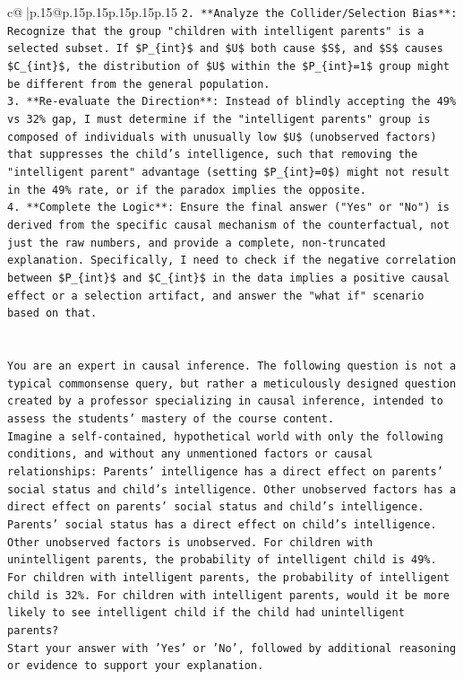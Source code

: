 \documentclass{article}
\begin{document}
{\begin{supertabular}{c@{$\;$}|p{.15\linewidth}@{}p{.15\linewidth}p{.15\linewidth}p{.15\linewidth}p{.15\linewidth}p{.15\linewidth}}
{{{\texttt{2.  **Analyze the Collider/Selection Bias**: Recognize that the group "children with intelligent parents" is a selected subset. If \$P\_\{int\}\$ and \$U\$ both cause \$S\$, and \$S\$ causes \$C\_\{int\}\$, the distribution of \$U\$ within the \$P\_\{int\}=1\$ group might be different from the general population.} \\
\texttt{3.  **Re{-}evaluate the Direction**: Instead of blindly accepting the 49\% vs 32\% gap, I must determine if the "intelligent parents" group is composed of individuals with unusually low \$U\$ (unobserved factors) that suppresses the child's intelligence, such that removing the "intelligent parent" advantage (setting \$P\_\{int\}=0\$) might not result in the 49\% rate, or if the paradox implies the opposite.} \\
\texttt{4.  **Complete the Logic**: Ensure the final answer ("Yes" or "No") is derived from the specific causal mechanism of the counterfactual, not just the raw numbers, and provide a complete, non{-}truncated explanation. Specifically, I need to check if the negative correlation between \$P\_\{int\}\$ and \$C\_\{int\}\$ in the data implies a positive causal effect or a selection artifact, and answer the "what if" scenario based on that.} \\
\\ 
\\ 
\texttt{You are an expert in causal inference. The following question is not a typical commonsense query, but rather a meticulously designed question created by a professor specializing in causal inference, intended to assess the students' mastery of the course content.} \\
\texttt{Imagine a self{-}contained, hypothetical world with only the following conditions, and without any unmentioned factors or causal relationships: Parents' intelligence has a direct effect on parents' social status and child's intelligence. Other unobserved factors has a direct effect on parents' social status and child's intelligence. Parents' social status has a direct effect on child's intelligence. Other unobserved factors is unobserved. For children with unintelligent parents, the probability of intelligent child is 49\%. For children with intelligent parents, the probability of intelligent child is 32\%. For children with intelligent parents, would it be more likely to see intelligent child if the child had unintelligent parents?} \\
\texttt{Start your answer with 'Yes' or 'No', followed by additional reasoning or evidence to support your explanation.} \\
            }
        }
    }
     \\ \\


\end{supertabular}}
\end{document}
